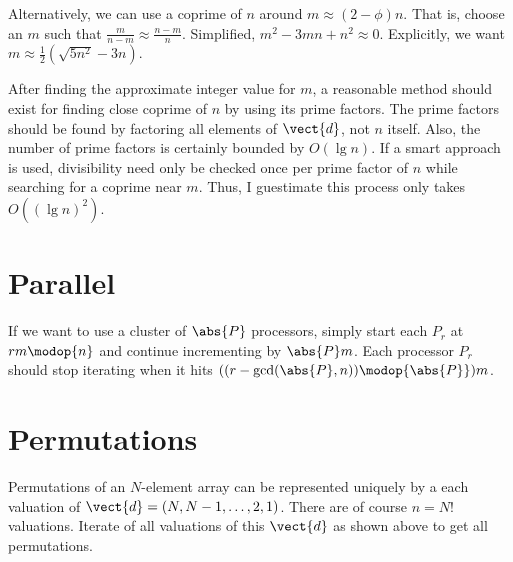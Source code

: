 Alternatively, we can use a coprime of $n$ around $m\approx(2-\phi)n$.
That is, choose an $m$ such that $\frac{m}{n-m}\approx\frac{n-m}{n}$.
Simplified, $m^2-3mn+n^2\approx 0$.
Explicitly, we want $m \approx \frac{1}{2}(\sqrt{5n^2}-3n)$.

After finding the approximate integer value for $m$, a reasonable method should exist for finding close coprime of $n$ by using its prime factors.
The prime factors should be found by factoring all elements of $\vect{d}$, not $n$ itself.
Also, the number of prime factors is certainly bounded by $O(\lg n)$.
If a smart approach is used, divisibility need only be checked once per prime factor of $n$ while searching for a coprime near $m$.
Thus, I guestimate this process only takes $O((\lg n)^2)$.

\section{Parallel}

If we want to use a cluster of $\abs{P}$ processors, simply start each $P_r$ at $r m\modop{n}$ and continue incrementing by $\abs{P}m$.
Each processor $P_r$ should stop iterating when it hits $((r - \gcd(\abs{P},n)) \modop{\abs{P}}) m$.

\section{Permutations}

Permutations of an $N$-element array can be represented uniquely by a each valuation of $\vect{d}=(N,N-1,\dots,2,1)$.
There are of course $n=N!$ valuations.
Iterate of all valuations of this $\vect{d}$ as shown above to get all permutations.




